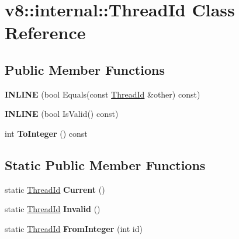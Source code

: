 \hypertarget{classv8_1_1internal_1_1_thread_id}{}\section{v8\+:\+:internal\+:\+:Thread\+Id Class Reference}
\label{classv8_1_1internal_1_1_thread_id}
\subsection*{Public Member Functions}
\begin{DoxyCompactItemize}
\item 
\hypertarget{classv8_1_1internal_1_1_thread_id_afd9cfcfc351b61c95cfd251b476c0682}{}{\bfseries I\+N\+L\+I\+N\+E} (bool Equals(const \hyperlink{classv8_1_1internal_1_1_thread_id}{Thread\+Id} \&other) const)\label{classv8_1_1internal_1_1_thread_id_afd9cfcfc351b61c95cfd251b476c0682}

\item 
\hypertarget{classv8_1_1internal_1_1_thread_id_a4bcdc5b6f92d522a2754527f96ea7dcd}{}{\bfseries I\+N\+L\+I\+N\+E} (bool Is\+Valid() const)\label{classv8_1_1internal_1_1_thread_id_a4bcdc5b6f92d522a2754527f96ea7dcd}

\item 
\hypertarget{classv8_1_1internal_1_1_thread_id_a4778892ff0453efb9af33bf2f74c6447}{}int {\bfseries To\+Integer} () const \label{classv8_1_1internal_1_1_thread_id_a4778892ff0453efb9af33bf2f74c6447}

\end{DoxyCompactItemize}
\subsection*{Static Public Member Functions}
\begin{DoxyCompactItemize}
\item 
\hypertarget{classv8_1_1internal_1_1_thread_id_a81c60d3524b03db2f154b7f682e7796f}{}static \hyperlink{classv8_1_1internal_1_1_thread_id}{Thread\+Id} {\bfseries Current} ()\label{classv8_1_1internal_1_1_thread_id_a81c60d3524b03db2f154b7f682e7796f}

\item 
\hypertarget{classv8_1_1internal_1_1_thread_id_a211793684e9dbeefb1165b8e547a448b}{}static \hyperlink{classv8_1_1internal_1_1_thread_id}{Thread\+Id} {\bfseries Invalid} ()\label{classv8_1_1internal_1_1_thread_id_a211793684e9dbeefb1165b8e547a448b}

\item 
\hypertarget{classv8_1_1internal_1_1_thread_id_ad4f2604e569a31908f37ebe26657ad60}{}static \hyperlink{classv8_1_1internal_1_1_thread_id}{Thread\+Id} {\bfseries From\+Integer} (int id)\label{classv8_1_1internal_1_1_thread_id_ad4f2604e569a31908f37ebe26657ad60}

\end{DoxyCompactItemize}

